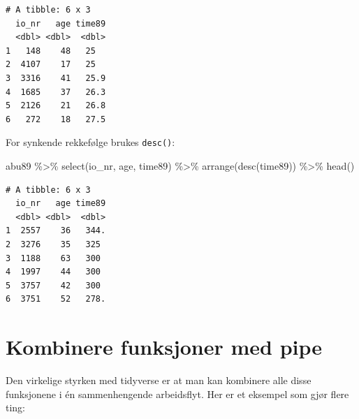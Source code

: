 \documentclass[
  norsk,
  letterpaper,
  DIV=11,
  numbers=noendperiod]{scrreprt}
\newenvironment{Shaded}{\begin{snugshade}}{\end{snugshade}}
\newcommand{\FunctionTok}[1]{\textcolor[rgb]{0.28,0.35,0.67}{#1}}
\newcommand{\NormalTok}[1]{\textcolor[rgb]{0.00,0.23,0.31}{#1}}
\newcommand{\SpecialCharTok}[1]{\textcolor[rgb]{0.37,0.37,0.37}{#1}}
\theoremstyle{definition}
\theoremstyle{remark}
\begin{document}
\begin{verbatim}
# A tibble: 6 x 3
  io_nr   age time89
  <dbl> <dbl>  <dbl>
1   148    48   25  
2  4107    17   25  
3  3316    41   25.9
4  1685    37   26.3
5  2126    21   26.8
6   272    18   27.5
\end{verbatim}

For synkende rekkefølge brukes \texttt{desc()}:

\begin{Shaded}
\begin{Highlighting}[]
\NormalTok{abu89 }\SpecialCharTok{\%\textgreater{}\%}
  \FunctionTok{select}\NormalTok{(io\_nr, age, time89) }\SpecialCharTok{\%\textgreater{}\%}
  \FunctionTok{arrange}\NormalTok{(}\FunctionTok{desc}\NormalTok{(time89)) }\SpecialCharTok{\%\textgreater{}\%}
  \FunctionTok{head}\NormalTok{()}
\end{Highlighting}
\end{Shaded}

\begin{verbatim}
# A tibble: 6 x 3
  io_nr   age time89
  <dbl> <dbl>  <dbl>
1  2557    36   344.
2  3276    35   325 
3  1188    63   300 
4  1997    44   300 
5  3757    42   300 
6  3751    52   278.
\end{verbatim}

\section{Kombinere funksjoner med
pipe}\label{kombinere-funksjoner-med-pipe}

Den virkelige styrken med tidyverse er at man kan kombinere alle disse
funksjonene i én sammenhengende arbeidsflyt. Her er et eksempel som gjør
flere ting:
\end{document}
